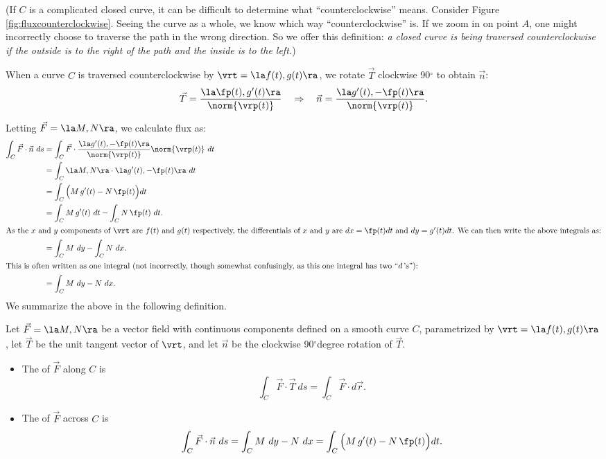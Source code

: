 (If $C$ is a complicated closed curve, it can be difficult to determine what ``counterclockwise'' means. Consider Figure \ref{fig:fluxcounterclockwise}. Seeing the curve as a whole, we know which way ``counterclockwise'' is. If we zoom in on point $A$, one might incorrectly choose to traverse the path in the wrong direction. So we offer this definition: \textit{a closed curve is being traversed counterclockwise if the outside is to the right of the path and the inside is to the left.})

When a curve $C$ is traversed counterclockwise by $\vrt = \la f(t), g(t)\ra$, we rotate $\vec T$ clockwise 90$^\circ$  to obtain $\vec n$:
\[
\vec T = \frac{\la \fp(t),g'(t)\ra}{\norm{\vrp(t)}} \quad \Rightarrow \quad \vec n = \frac{\la g'(t),-\fp(t)\ra}{\norm{\vrp(t)}}.
\]

Letting $\vec F = \la M, N\ra$, we calculate flux as:
\begin{align*}
\int_C \vec F\cdot \vec n\ ds &= \int_C \vec F\cdot \frac{\la g'(t),-\fp(t)\ra}{\norm{\vrp(t)}} \norm{\vrp(t)}\ dt \\
				&= \int_C \la M, N\ra \cdot \la g'(t),-\fp(t)\ra\ dt \\
				&= \int_C \Big(M\,g'(t) - N\,\fp(t)\Big)dt\\
				&= \int_C M\,g'(t)\ dt - \int_C N\,\fp(t)\ dt.\\
				\intertext{As the $x$ and $y$ components of $\vrt$ are $f(t)$ and $g(t)$ respectively, the differentials of $x$ and $y$ are $dx = \fp(t)dt$ and $dy=g'(t)dt$. We can then write the above integrals as:}
				&= \int_C M\ dy - \int_C N\ dx.\\
				\intertext{This is often written as one integral (not incorrectly, though somewhat confusingly, as this one integral has two ``$d$\,'s''):}
				&=\int_CM\ dy -N\ dx.
\end{align*}
We summarize the above in the following definition.

{Let $\vec F=\la M,N\ra$ be a vector field with continuous components defined on a smooth curve $C$, parametrized by $\vrt =\la f(t),g(t)\ra$, let $\vec T$ be the unit tangent vector of $\vrt$, and let $\vec n$ be the clockwise 90$^\circ$degree rotation of $\vec T$.
\begin{itemize}
	\item The  of $\vec F$ along $C$ is
\[
\int_C \vec F\cdot\vec T\ ds=\int_C \vec F\cdot d\vec r.
\]
	\item The  of $\vec F$ across $C$ is
\[
\int_C \vec F\cdot \vec n\ ds =  \int_C M\ dy -N\ dx = \int_C\Big(M\,g'(t) - N\,\fp(t)\Big)dt. 
\]
\end{itemize}
}

